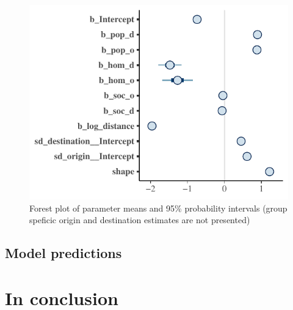 \documentclass[fleqn,10pt]{SelfArx} %
\begin{document}
\begin{figure}
  \includegraphics[width = \columnwidth]{../fig/forestplot.pdf}
  \caption{Forest plot of parameter means and 95\% probability intervals (group speficic origin and destination estimates are not presented)}
  \label{fig:forestplot}
\end{figure}

\subsection{Model predictions}

\section{In conclusion}
	
	
	\printbibliography
	
	
\end{document}
